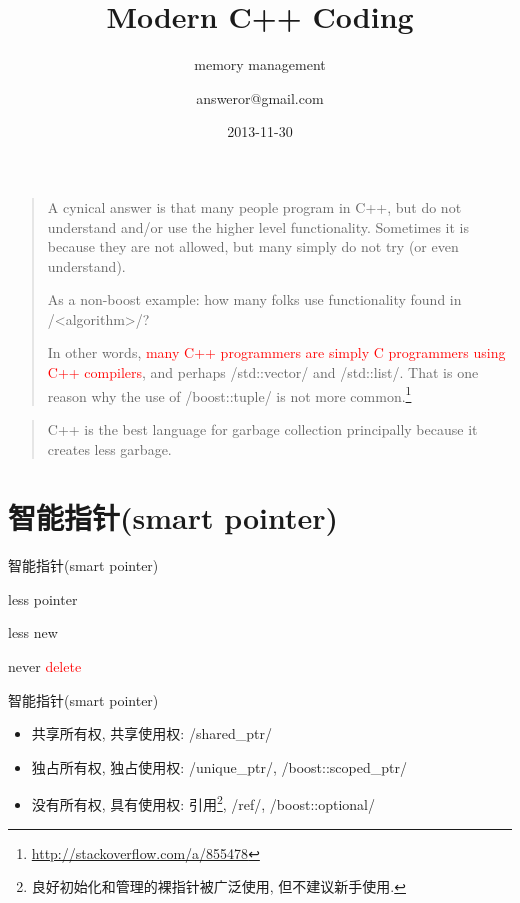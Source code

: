 \documentclass[compress]{beamer}
\title{Modern C++ Coding}
\subtitle{memory management}
\author{answeror@gmail.com}
\date{2013-11-30}
\begin{document}
\frame{\titlepage}



\begin{frame}
    \begin{quote}
        A cynical answer is that many people program in C++, but do not understand and/or use the higher level functionality. Sometimes it is because they are not allowed, but many simply do not try (or even understand).

        As a non-boost example: how many folks use functionality found in /<algorithm>/?

        In other words, \textcolor{red}{many C++ programmers are simply C programmers using C++ compilers}, and perhaps /std::vector/ and /std::list/. That is one reason why the use of /boost::tuple/ is not more common.\footnote{\url{http://stackoverflow.com/a/855478}}
    \end{quote}
\end{frame}

\begin{frame}
    \begin{quote}
        C++ is the best language for garbage collection principally because it creates less garbage.
    \end{quote}
    \vskip5mm
    \hspace*{}
\end{frame}

\newcommand{\smartpointer}{智能指针(smart pointer)}
\section{\smartpointer}

\begin{frame}{\smartpointer}
    \begin{center}
        \large less pointer\pause
        
        less new\pause

        never \textcolor{red}{delete}
    \end{center}
\end{frame}

\begin{frame}{\smartpointer}
    \begin{itemize}[<+->]
        \item 共享所有权, 共享使用权: /shared_ptr/
        \item 独占所有权, 独占使用权: /unique_ptr/, /boost::scoped_ptr/
        \item 没有所有权, 具有使用权: 引用\footnote{良好初始化和管理的裸指针被广泛使用, 但不建议新手使用.}, /ref/, /boost::optional/
    \end{itemize}
    \vskip5mm
\end{frame}
\end{document}
